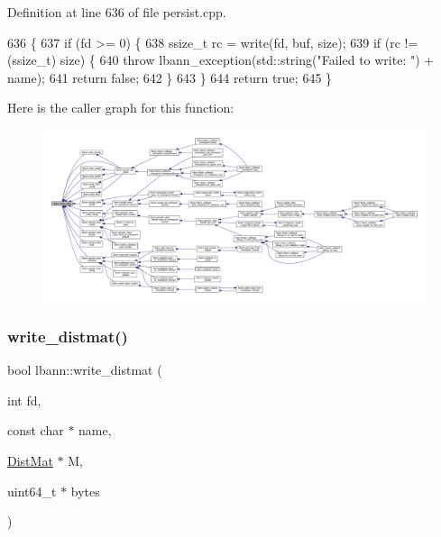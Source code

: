 Definition at line 636 of file persist.\+cpp.


\begin{DoxyCode}
636                                                                               \{
637   \textcolor{keywordflow}{if} (fd >= 0) \{
638     ssize\_t rc = write(fd, buf, size);
639     \textcolor{keywordflow}{if} (rc != (ssize\_t) size) \{
640       \textcolor{keywordflow}{throw} lbann\_exception(std::string(\textcolor{stringliteral}{"Failed to write: "}) + name);
641       \textcolor{keywordflow}{return} \textcolor{keyword}{false};
642     \}
643   \}
644   \textcolor{keywordflow}{return} \textcolor{keyword}{true};
645 \}
\end{DoxyCode}
Here is the caller graph for this function\+:\nopagebreak
\begin{figure}[H]
\begin{center}
\leavevmode
\includegraphics[width=350pt]{namespacelbann_aed95061796f19fa1648dcc99dc335abd_icgraph}
\end{center}
\end{figure}
\mbox{\label{namespacelbann_aa7b4e710f444588dfcf4188b84b33420}} 
\subsubsection{\texorpdfstring{write\+\_\+distmat()}{write\_distmat()}}
{\footnotesize\ttfamily bool lbann\+::write\+\_\+distmat (\begin{DoxyParamCaption}\item[{int}]{fd,  }\item[{const char $\ast$}]{name,  }\item[{\hyperlink{base_8hpp_a0fab5387556805cfeac3e7e567bf66c5}{Dist\+Mat} $\ast$}]{M,  }\item[{uint64\+\_\+t $\ast$}]{bytes }\end{DoxyParamCaption})}



